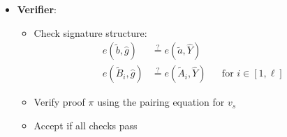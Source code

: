 \begin{itemize}
\begin{itemize}
\begin{itemize}
        \item \textbf{Verifier}:
            \begin{itemize}
                \item Check signature structure:
                    \begin{align*}
                        e(\tilde{b}, \hat{g}) &\stackrel{?}{=} e(\tilde{a}, \widehat{Y}) \\
                        e(\tilde{B}_i, \hat{g}) &\stackrel{?}{=} e(\tilde{A}_i, \widehat{Y}) && \text{for } i \in [1,\ell]
                    \end{align*}
                \item Verify proof $\pi$ using the pairing equation for $v_s$
                \item Accept if all checks pass
            \end{itemize}
    \end{itemize}
\end{itemize}
\end{itemize}


